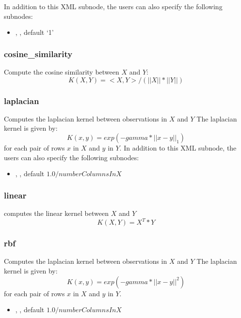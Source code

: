 In addition to this XML subnode, the users can also specify the following subnodes:
\begin{itemize}
  \item {}, , default `1'
\end{itemize}

\subsubsection{cosine\_similarity}
Compute the cosine similarity between $X$ and $Y$:
\begin{equation}
  K(X, Y) = <X, Y> / (||X||*||Y||)
\end{equation}


\subsubsection{laplacian}
Computes the laplacian kernel between observations in $X$ and $Y$
The laplacian kernel is given by:
\begin{equation}
  K(x, y) = exp(- gamma * ||x - y||_1)
\end{equation}
for each pair of rows $x$ in $X$ and $y$ in $Y$.
In addition to this XML subnode, the users can also specify the following subnodes:
\begin{itemize}
  \item {}, , default $1.0/numberColumnsInX$
\end{itemize}

\subsubsection{linear}
computes the linear kernel between $X$ and $Y$
\begin{equation}
  K(X, Y) = X^T * Y
\end{equation}

\subsubsection{rbf}
Computes the laplacian kernel between observations in $X$ and $Y$
The laplacian kernel is given by:
\begin{equation}
  K(x, y) = exp(- gamma * ||x - y||^2)
\end{equation}
for each pair of rows $x$ in $X$ and $y$ in $Y$.
\begin{itemize}
  \item {}, , default $1.0/numberColumnsInX$
\end{itemize}

